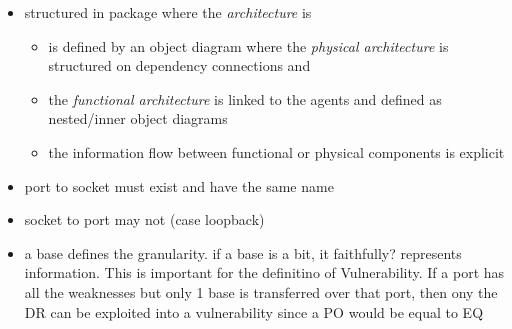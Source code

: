 \begin{itemize}
\item structured in package where the \emph{architecture} is
\begin{itemize}
\item is defined by an object diagram where the \emph{physical architecture} is structured on dependency connections and
\item the \emph{functional architecture} is linked to the agents and defined as nested/inner object diagrams
\item the information flow between functional or physical components is explicit 
\end{itemize}
\item port to socket must exist and have the same name
\item socket to port may not (case loopback)
\item a base defines the granularity. if a base is a bit, it faithfully? represents information. This is important 
	for the definitino of Vulnerability. If a port has all the weaknesses but only 1 base is transferred over that port,
		then ony the DR can be exploited into a vulnerability since a PO would be equal to EQ
\end{itemize}
